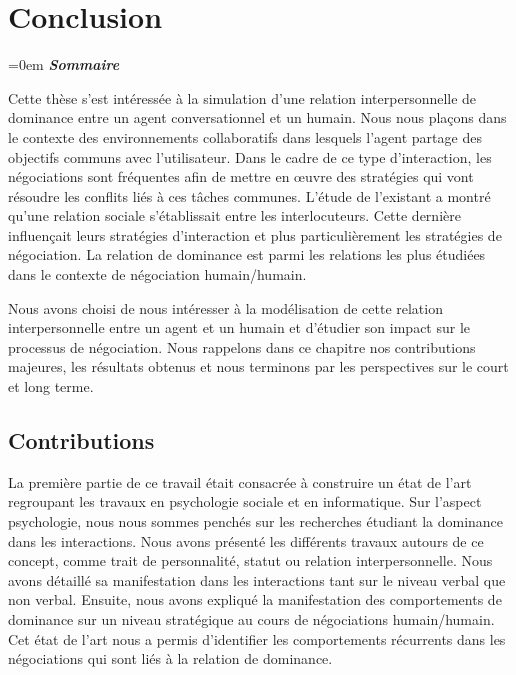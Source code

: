 \chapter{Conclusion}

\begingroup
\parindent=0em
\emph{\textbf{Sommaire}}
\localtableofcontents 
\clearpage
\endgroup

Cette thèse s'est intéressée à la simulation d'une relation interpersonnelle de dominance entre un agent conversationnel et un humain.
Nous nous plaçons dans le contexte des environnements collaboratifs dans lesquels l'agent partage des objectifs communs avec l'utilisateur. Dans le cadre de ce type d'interaction, les négociations sont fréquentes afin de mettre en œuvre des stratégies qui vont résoudre les conflits liés à ces tâches communes. 
L'étude de l'existant a montré qu'une relation sociale s'établissait entre les interlocuteurs. Cette dernière influençait leurs stratégies d'interaction et plus particulièrement les stratégies de négociation. La relation de dominance est parmi les relations les plus étudiées dans le contexte de négociation humain/humain. 

Nous avons choisi de nous intéresser à la modélisation de cette relation interpersonnelle entre un agent et un humain et d'étudier son impact sur le processus de négociation.  Nous rappelons dans ce chapitre nos contributions majeures, les résultats obtenus et nous terminons par les perspectives sur le court et long terme. 

 
\section{Contributions}
	La première partie de ce travail était consacrée à construire un état de l'art regroupant les travaux en psychologie sociale et en informatique.  Sur l'aspect psychologie, nous nous sommes penchés sur les recherches étudiant la dominance dans les interactions. Nous avons présenté les différents travaux autours de ce concept, comme trait de personnalité, statut ou relation interpersonnelle.
	Nous avons détaillé sa manifestation dans les interactions tant sur le niveau verbal que non verbal. Ensuite, nous avons expliqué la manifestation des comportements de dominance sur un niveau stratégique au cours de négociations humain/humain.
	Cet état de l'art nous a permis d'identifier les comportements récurrents dans les négociations qui sont liés à la relation de dominance.
	
